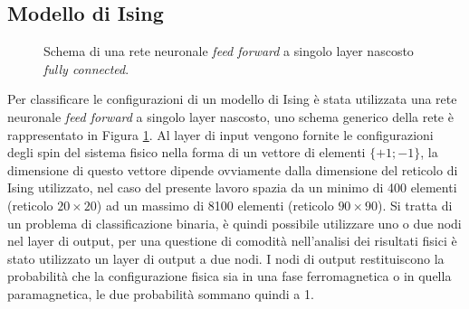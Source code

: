 \documentclass{article}
\begin{document}
\subsection{Modello di Ising}

\begin{figure}[ht]
\centering
{}
\caption{Schema di una rete neuronale \emph{feed forward} a singolo layer nascosto \emph{fully connected}.}
\label{fig:ffn}
\end{figure}

Per classificare le configurazioni di un modello di Ising è stata utilizzata una rete neuronale \emph{feed forward} a singolo layer nascosto, uno schema generico della rete è rappresentato in Figura \ref{fig:ffn}.
Al layer di input vengono fornite le configurazioni degli spin del sistema fisico nella forma di un vettore di elementi $\{+1;-1\}$, la dimensione di questo vettore dipende ovviamente dalla dimensione del reticolo di Ising utilizzato, nel caso del presente lavoro spazia da un minimo di 400 elementi (reticolo $20\times20$) ad un massimo di 8100 elementi (reticolo $90\times90$).
Si tratta di un problema di classificazione binaria, è quindi possibile utilizzare uno o due nodi nel layer di output, per una questione di comodità nell'analisi dei risultati fisici è stato utilizzato un layer di output a due nodi.
I nodi di output restituiscono la probabilità che la configurazione fisica sia in una fase ferromagnetica o in quella paramagnetica, le due probabilità sommano quindi a 1.
\end{document}
